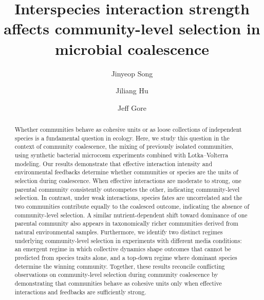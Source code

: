 
\title{Interspecies interaction strength affects community-level selection in microbial coalescence}



\author[1]{Jinyeop Song}
\author[1,2]{Jiliang Hu}
\author[1]{Jeff Gore}


\date{}

\maketitle

\begin{abstract}
Whether communities behave as cohesive units or as loose collections of independent species is a fundamental question in ecology. Here, we study this question in the context of community coalescence, the mixing of previously isolated communities, using synthetic bacterial microcosm experiments combined with Lotka--Volterra modeling. Our results demonstrate that effective interaction intensity and environmental feedbacks determine whether communities or species are the units of selection during coalescence. When effective interactions are moderate to strong, one parental community consistently outcompetes the other, indicating community-level selection. In contrast, under weak interactions, species fates are uncorrelated and the two communities contribute equally to the coalesced outcome, indicating the absence of community-level selection. A similar nutrient-dependent shift toward dominance of one parental community also appears in taxonomically richer communities derived from natural environmental samples. Furthermore, we identify two distinct regimes underlying community-level selection in experiments with different media conditions: an emergent regime in which collective dynamics shape outcomes that cannot be predicted from species traits alone, and a top-down regime where dominant species determine the winning community. Together, these results reconcile conflicting observations on community-level selection during community coalescence by demonstrating that communities behave as cohesive units only when effective interactions and feedbacks are sufficiently strong.
\end{abstract}

\newpage

